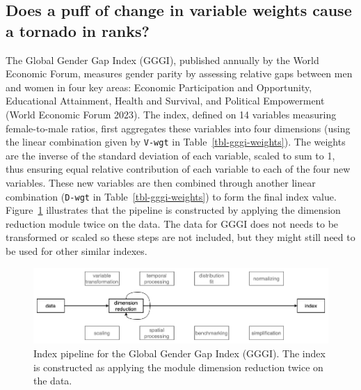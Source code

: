 \documentclass[
]{interact}
\begin{document}
\hypertarget{does-a-puff-of-change-in-variable-weights-cause-a-tornado-in-ranks}{%
\subsection{Does a puff of change in variable weights cause a tornado in
ranks?}\label{does-a-puff-of-change-in-variable-weights-cause-a-tornado-in-ranks}}

The Global Gender Gap Index (GGGI), published annually by the World
Economic Forum, measures gender parity by assessing relative gaps
between men and women in four key areas: Economic Participation and
Opportunity, Educational Attainment, Health and Survival, and Political
Empowerment (World Economic Forum 2023). The index, defined on 14
variables measuring female-to-male ratios, first aggregates these
variables into four dimensions (using the linear combination given by
\texttt{V-wgt} in Table~\ref{tbl-gggi-weights}). The weights are the
inverse of the standard deviation of each variable, scaled to sum to 1,
thus ensuring equal relative contribution of each variable to each of
the four new variables. These new variables are then combined through
another linear combination (\texttt{D-wgt} in
Table~\ref{tbl-gggi-weights}) to form the final index value.
Figure~\ref{fig-pp-gggi} illustrates that the pipeline is constructed by
applying the dimension reduction module twice on the data. The data for
GGGI does not needs to be transformed or scaled so these steps are not
included, but they might still need to be used for other similar
indexes.

\begin{figure}

{\centering \includegraphics[width=1\textwidth,height=0.9\textheight]{figures/pipeline-gggi.png}

}

\caption{\label{fig-pp-gggi}Index pipeline for the Global Gender Gap
Index (GGGI). The index is constructed as applying the module dimension
reduction twice on the data.}

\end{figure}
\end{document}
